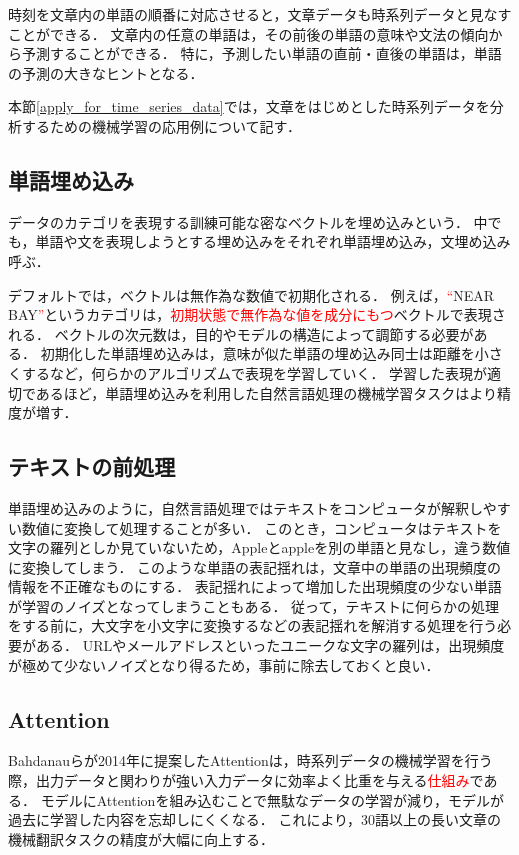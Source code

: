 \documentclass[12pt,a4j]{jreport}
\begin{document}
時刻を文章内の単語の順番に対応させると，文章データも時系列データと見なすことができる．
文章内の任意の単語は，その前後の単語の意味や文法の傾向から予測することができる．
特に，予測したい単語の直前・直後の単語は，単語の予測の大きなヒントとなる．

本節\ref{apply_for_time_series_data}では，文章をはじめとした時系列データを分析するための機械学習の応用例について記す．

\subsection{単語埋め込み}
データのカテゴリを表現する訓練可能な密なベクトルを埋め込みという\cite{aurellen20}．
中でも，単語や文を表現しようとする埋め込みをそれぞれ単語埋め込み，文埋め込み呼ぶ．

デフォルトでは，ベクトルは無作為な数値で初期化される．
例えば，\textcolor{red}{``}NEAR BAY\textcolor{red}{''}というカテゴリは，\textcolor{red}{初期状態で無作為な値を成分にもつ}ベクトルで表現される．
ベクトルの次元数は，目的やモデルの構造によって調節する必要がある．
初期化した単語埋め込みは，意味が似た単語の埋め込み同士は距離を小さくするなど，何らかのアルゴリズムで表現を学習していく．
学習した表現が適切であるほど，単語埋め込みを利用した自然言語処理の機械学習タスクはより精度が増す．

\subsection{テキストの前処理}
\label{subsection_texts_preprocessing}
単語埋め込みのように，自然言語処理ではテキストをコンピュータが解釈しやすい数値に変換して処理することが多い．
このとき，コンピュータはテキストを文字の羅列としか見ていないため，Appleとappleを別の単語と見なし，違う数値に変換してしまう．
このような単語の表記揺れは，文章中の単語の出現頻度の情報を不正確なものにする．
表記揺れによって増加した出現頻度の少ない単語が学習のノイズとなってしまうこともある．
従って，テキストに何らかの処理をする前に，大文字を小文字に変換するなどの表記揺れを解消する処理を行う必要がある．
URLやメールアドレスといったユニークな文字の羅列は，出現頻度が極めて少ないノイズとなり得るため，事前に除去しておくと良い．


\subsection{Attention}
Bahdanauらが2014年に提案したAttentionは，時系列データの機械学習を行う際，出力データと関わりが強い入力データに効率よく比重を与える\textcolor{red}{仕組み}である\cite{aurellen20}\cite{bahdanau_neural_2016}．
モデルにAttentionを組み込むことで無駄なデータの学習が減り，モデルが過去に学習した内容を忘却しにくくなる．
これにより，30語以上の長い文章の機械翻訳タスクの精度が大幅に向上する．
\end{document}
